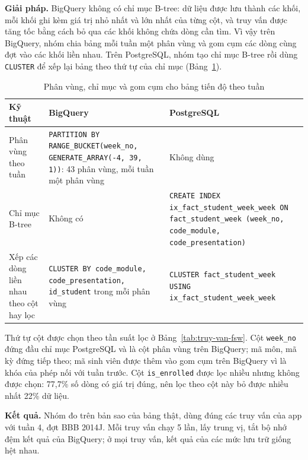 \textbf{Giải pháp.} BigQuery không có chỉ mục B-tree: dữ liệu được lưu thành các khối, mỗi khối
ghi kèm giá trị nhỏ nhất và lớn nhất của từng cột, và truy vấn được tăng tốc bằng cách bỏ qua
các khối không chứa dòng cần tìm. Vì vậy trên BigQuery, nhóm chia bảng mỗi tuần một phân vùng và
gom cụm các dòng cùng đợt vào các khối liền nhau. Trên PostgreSQL, nhóm tạo chỉ mục B-tree rồi
dùng \texttt{CLUSTER} để xếp lại bảng theo thứ tự của chỉ mục (Bảng~\ref{tab:giai-phap-chi-muc}).

\begin{table}[htbp]
\centering
\small
\begin{tabularx}{\textwidth}{|p{3.0cm}|X|X|}
\hline
\textbf{Kỹ thuật} & \textbf{BigQuery} & \textbf{PostgreSQL} \\ \hline
Phân vùng theo tuần & \texttt{PARTITION BY RANGE\_BUCKET(week\_no, GENERATE\_ARRAY(-4, 39, 1))}: 43 phân vùng, mỗi tuần một phân vùng & Không dùng \\ \hline
Chỉ mục B-tree & Không có & \texttt{CREATE INDEX ix\_fact\_student\_week\_week ON fact\_student\_week (week\_no, code\_module, code\_presentation)} \\ \hline
Xếp các dòng liền nhau theo cột hay lọc & \texttt{CLUSTER BY code\_module, code\_presentation, id\_student} trong mỗi phân vùng & \texttt{CLUSTER fact\_student\_week USING ix\_fact\_student\_week\_week} \\ \hline
\end{tabularx}
\caption{Phân vùng, chỉ mục và gom cụm cho bảng tiến độ theo tuần}
\label{tab:giai-phap-chi-muc}
\end{table}

Thứ tự cột được chọn theo tần suất lọc ở Bảng~\ref{tab:truy-van-fsw}. Cột \texttt{week\_no} đứng
đầu chỉ mục PostgreSQL và là cột phân vùng trên BigQuery; mã môn, mã kỳ đứng tiếp theo; mã sinh
viên được thêm vào gom cụm trên BigQuery vì là khóa của phép nối với tuần trước. Cột
\texttt{is\_enrolled} được lọc nhiều nhưng không được chọn: 77,7\% số dòng có giá trị đúng, nên lọc
theo cột này bỏ được nhiều nhất 22\% dữ liệu.

\textbf{Kết quả.} Nhóm đo trên bản sao của bảng thật, dùng đúng các truy vấn của app với tuần 4,
đợt BBB 2014J. Mỗi truy vấn chạy 5 lần, lấy trung vị, tắt bộ nhớ đệm kết quả của BigQuery; ở mọi
truy vấn, kết quả của các mức lưu trữ giống hệt nhau.

